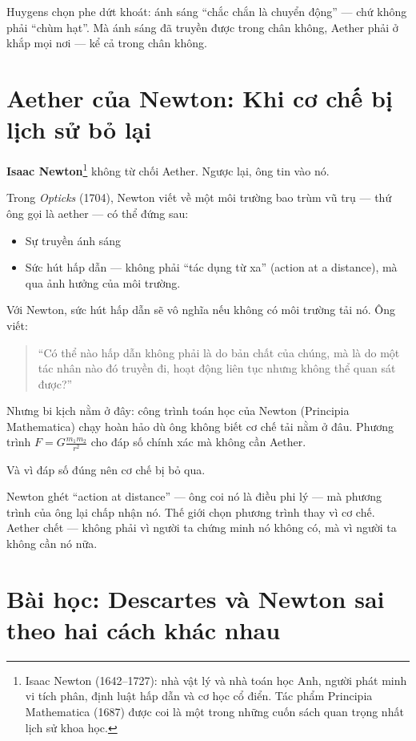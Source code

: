 Huygens chọn phe dứt khoát: ánh sáng ``chắc chắn là chuyển động'' — chứ không phải ``chùm hạt''. Mà ánh sáng đã truyền được trong chân không, Aether phải ở khắp mọi nơi — kể cả trong chân không.


\section{Aether của Newton: Khi cơ chế bị lịch sử bỏ lại}

\textbf{Isaac Newton}\footnote{Isaac Newton (1642--1727): nhà vật lý và nhà toán học Anh, người phát minh vi tích phân, định luật hấp dẫn và cơ học cổ điển. Tác phẩm Principia Mathematica (1687) được coi là một trong những cuốn sách quan trọng nhất lịch sử khoa học.} không từ chối Aether. Ngược lại, ông tin vào nó.

Trong \emph{Opticks} (1704), Newton viết về một môi trường bao trùm vũ trụ — thứ ông gọi là aether — có thể đứng sau:
\begin{itemize}
  \item Sự truyền ánh sáng
  \item Sức hút hấp dẫn — không phải “tác dụng từ xa” (action at a distance), mà qua ảnh hưởng của môi trường.
\end{itemize}

Với Newton, sức hút hấp dẫn sẽ vô nghĩa nếu không có môi trường tải nó. Ông viết:

\begin{quote}
“Có thể nào hấp dẫn không phải là do bản chất của chúng, mà là do một tác nhân nào đó truyền đi, hoạt động liên tục nhưng không thể quan sát được?”
\end{quote}

Nhưng bi kịch nằm ở đây: công trình toán học của Newton (Principia Mathematica) chạy hoàn hảo dù ông không biết cơ chế tải nằm ở đâu. Phương trình $F = G \frac{m_1 m_2}{r^2}$ cho đáp số chính xác mà không cần Aether.

Và vì đáp số đúng nên cơ chế bị bỏ qua.

Newton ghét “action at distance” — ông coi nó là điều phi lý — mà phương trình của ông lại chấp nhận nó. Thế giới chọn phương trình thay vì cơ chế. Aether chết — không phải vì người ta chứng minh nó không có, mà vì người ta không cần nó nữa.


\section{Bài học: Descartes và Newton sai theo hai cách khác nhau}

